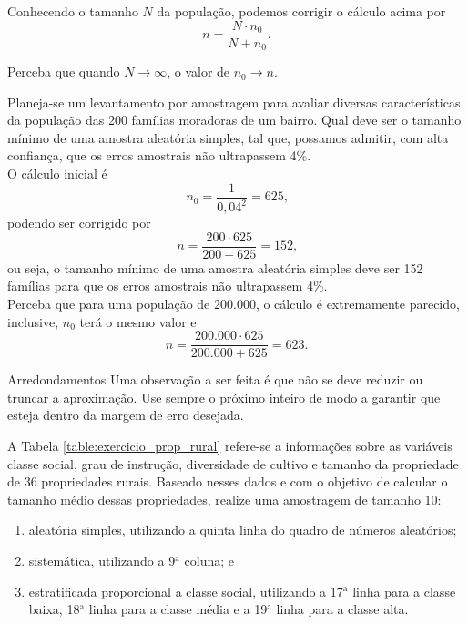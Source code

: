 \documentclass[11pt,fleqn]{book}
\numberwithin{mpicture}{chapter}
\numberwithin{mtable}{chapter}
\numberwithin{mframe}{chapter}
\begin{document}
Conhecendo o tamanho $N$ da população, podemos corrigir o cálculo acima por
\begin{equation}
	n=\frac{N\cdot n_0}{N+n_0}\text{.}
\end{equation}

\begin{remark}
	Perceba que quando $N\to\infty$, o valor de $n_0\to n$.
\end{remark}

\begin{example}
	Planeja-se um levantamento por amostragem para avaliar diversas características da população das 200 famílias moradoras de um bairro. Qual deve ser o tamanho mínimo de uma amostra aleatória simples, tal que, possamos admitir, com alta confiança, que os erros amostrais não ultrapassem 4\%.\\
	
	O cálculo inicial é
	\[
		n_0=\frac{1}{0,04^2}=625\text{,}
	\]
	podendo ser corrigido por
	\[
		n=\frac{200\cdot 625}{200+625}=152\text{,}
	\]
	ou seja, o tamanho mínimo de uma amostra aleatória simples deve ser 152 famílias para que os erros amostrais não ultrapassem 4\%.\\
	
	Perceba que para uma população de 200.000, o cálculo é extremamente parecido, inclusive, $n_0$ terá o mesmo valor e
	\[
		n=\frac{200.000\cdot 625}{200.000+625}=623\text{.}
	\]
\end{example}

\begin{note}{Arredondamentos}
	Uma observação a ser feita é que não se deve reduzir ou truncar a aproximação. Use sempre o próximo inteiro de modo a garantir que esteja dentro da margem de erro desejada.
\end{note}

\begin{pageWidthArea}
	\begin{exerciseArea}
		\item A Tabela \ref{table:exercicio_prop_rural} refere-se a informações sobre as variáveis classe social, grau de instrução, diversidade de cultivo e tamanho da propriedade de 36 propriedades rurais. Baseado nesses dados e com o objetivo de calcular o tamanho médio dessas propriedades, realize uma amostragem de tamanho 10:
		\begin{enumerate}[label=\alph*)]
			\item aleatória simples, utilizando a quinta linha do quadro de números aleatórios;
			\item sistemática, utilizando a 9$^{\text{a}}$ coluna; e
			\item estratificada proporcional a classe social, utilizando a 17$^{\text{a}}$ linha para a classe baixa, 18$^{\text{a}}$ linha para a classe média e a 19$^{\text{a}}$ linha para a classe alta.
		\end{enumerate}
	\end{exerciseArea}
\end{pageWidthArea}
\end{document}
